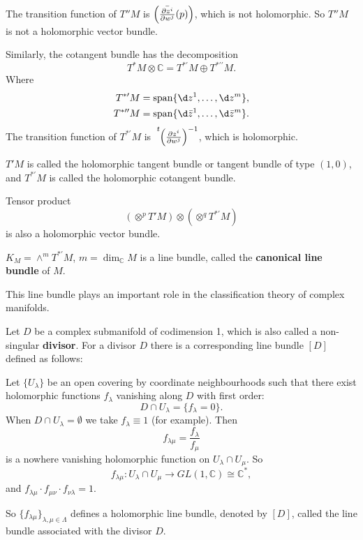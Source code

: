 \documentclass[12pt]{article}
\begin{document}
The transition function of \(T''M\) is \(\left(\bar{\pdv{z^i}{w^j}}(p)\right)\),
which is not holomorphic. So \(T''M\) is not a holomorphic vector bundle.

Similarly, the cotangent bundle has the decomposition \[
  T^*M\otimes \mathbb{C}=T^{*\prime}M\oplus T^{*\prime\prime}M
.\] Where
\begin{align*}
  T^{*\prime}M&=\Span\{\dd{z^1},\ldots,\dd{z^m}\}, \\
  T^{*\prime\prime}M&=\Span\{\dd{\bar{z}^1},\ldots,\dd{\bar{z}^m}\}
.\end{align*}
The transition function of \(T^{*\prime}M\) is \(\tensor[^t]{\left(\pdv{z^i}{w^j}
\right)}{^{-1}}\), which is holomorphic.

\(T'M\) is called the holomorphic tangent bundle or tangent bundle of type \((1,0)\),
and \(T^{*\prime}M\) is called the holomorphic cotangent bundle.

\begin{example}
  Tensor product \[
    (\otimes^p T'M)\otimes (\otimes^q T^{*\prime}M)
  \] is also a holomorphic vector bundle.
\end{example}

\begin{definition}
  \(K_M=\wedge^m T^{*\prime}M\), \(m=\dim_{\mathbb{C}}M\) is a line bundle, called the
  \textbf{canonical line bundle} of \(M\).
  
  This line bundle plays an important role in the classification theory of complex 
  manifolds.
\end{definition}

Let \(D\) be a complex submanifold of codimension 1, which is also called a
non-singular \textbf{divisor}. For a divisor \(D\) there is a corresponding line
bundle \([D]\) defined as follows:

Let \(\{U_\lambda\}\) be an open covering by coordinate neighbourhoods such that there 
exist holomorphic functions \(f_\lambda\) vanishing along \(D\) with first order: \[
  D\cap U_\lambda=\{f_\lambda=0\}
.\] When \(D\cap U_\lambda=\emptyset\) we take \(f_\lambda\equiv 1\) (for example).
Then \[
  f_{\lambda\mu}=\frac{f_\lambda}{f_\mu}
\] is a nowhere vanishing holomorphic function on \(U_\lambda\cap U_\mu\). So \[
  f_{\lambda\mu}\colon U_\lambda\cap U_\mu\longrightarrow GL(1,\mathbb{C})\cong
  \mathbb{C}^*
,\] and \(f_{\lambda\mu}\cdot f_{\mu\nu}\cdot f_{\nu\lambda}=1\).

So \(\{f_{\lambda\mu}\}_{\lambda,\mu\in \Lambda}\) defines a holomorphic line bundle,
denoted by \([D]\), called the line bundle associated with the divisor \(D\).
\end{document}
